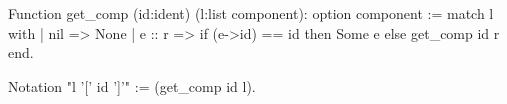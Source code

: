 Function get_comp (id:ident) (l:list component): option component :=
    match l with
      | nil    => None
      | e :: r => if (e->id) == id then Some e else get_comp id r
    end.

Notation "l '[' id ']'" := (get_comp id l).